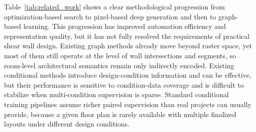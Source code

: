 Table~\ref{tab:related_work} shows a clear methodological progression from optimization-based search to pixel-based deep generation and then to graph-based learning. This progression has improved automation efficiency and representation quality, but it has not fully resolved the requirements of practical shear wall design. Existing graph methods already move beyond raster space, yet most of them still operate at the level of wall intersections and segments, so room-level architectural semantics remain only indirectly encoded. Existing conditional methods introduce design-condition information and can be effective, but their performance is sensitive to condition-data coverage and is difficult to stabilize when multi-condition supervision is sparse. Standard conditional training pipelines assume richer paired supervision than real projects can usually provide, because a given floor plan is rarely available with multiple finalized layouts under different design conditions.

